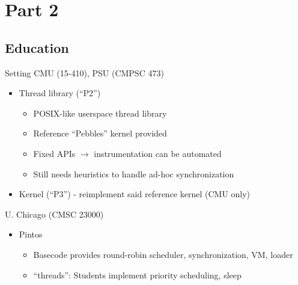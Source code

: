 \documentclass[xcolor=dvipsnames]{beamer}
\newcommand\hilight[2]{\color{#1}#2\color{black}}
\begin{document}

\section{Part 2}
\subsection{Education}

\breakslide{\Large \bf \hilight{sect-410}{Education}}

\begin{frame}{Setting}
	CMU (15-410), PSU (CMPSC 473)
	\begin{itemize}
		\item Thread library (``P2'')
			\begin{itemize}
				\item POSIX-like userspace thread library %
				\item Reference ``Pebbles'' kernel provided
				\item Fixed APIs $\rightarrow$ instrumentation can be automated
				\item Still needs heuristics to handle ad-hoc synchronization
			\end{itemize}
		\item Kernel (``P3'') - reimplement said reference kernel (CMU only)
	\end{itemize}
	\pause
	\linegap

	U. Chicago (CMSC 23000)
	\begin{itemize}
		\item Pintos %
		\begin{itemize}
			\item Basecode provides round-robin scheduler, synchronization, VM, loader
			\item ``threads'': Students implement priority scheduling, sleep


\end{itemize}
\end{itemize}
\end{frame}
\end{document}
